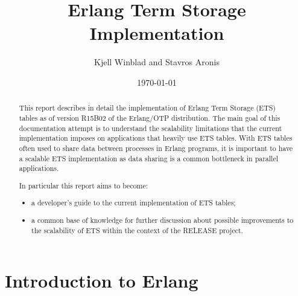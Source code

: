 \documentclass[aps,pre,preprint,nofootinbib]{revtex4}
\begin{document}
\title{Erlang Term Storage Implementation}
\author{Kjell Winblad and Stavros Aronis}
\date{\today}


\begin{abstract}

This report describes in detail the implementation of Erlang Term Storage (ETS) tables as of version R15B02 of the Erlang/OTP distribution.
The main goal of this documentation attempt is to understand the scalability limitations that the current implementation imposes on applications that heavily use ETS tables.
With ETS tables often used to share data between processes in Erlang programs, it is important to have a scalable ETS implementation as data sharing is a common bottleneck in parallel applications.

In particular this report aims to become:
\begin{itemize}
\item a developer's guide to the current implementation of ETS tables;
\item a common base of knowledge for further discussion about possible improvements to the scalability of ETS within the context of the RELEASE project.
\end{itemize}

\end{abstract}

\maketitle

\section{Introduction to Erlang}\label{sec:erlang_intro}
\end{document}
